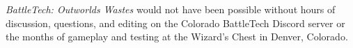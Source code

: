 \emph{BattleTech: Outworlds Wastes} would not have been possible without hours of discussion, questions, and editing on the Colorado BattleTech Discord server or the months of gameplay and testing at the Wizard's Chest in Denver, Colorado.
